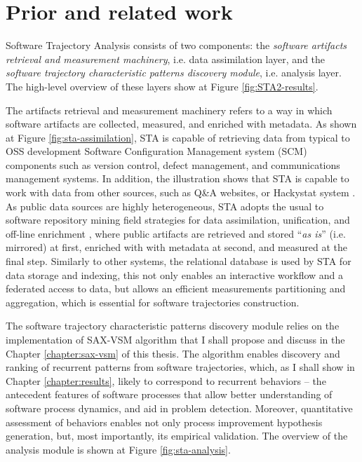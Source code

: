 \chapter{Prior and related work}\label{chapter_background_work}
Software Trajectory Analysis consists of two components: 
the \textit{software artifacts retrieval and measurement machinery}, i.e. data assimilation layer, 
and the \textit{software trajectory characteristic patterns discovery module}, i.e. analysis layer. 
The high-level overview of these layers show at Figure \ref{fig:STA2-results}.

The artifacts retrieval and measurement machinery refers to a way in which software artifacts are 
collected, measured, and enriched with metadata. 
As shown at Figure \ref{fig:sta-assimilation}, STA is capable of retrieving data from typical to 
OSS development Software Configuration Management system (SCM) components such as version control, 
defect management, and communications management systems. 
In addition, the illustration shows that STA is capable to work with data from other sources, 
such as Q\&A websites, or Hackystat system \cite{citeulike:557296}.
As public data sources are highly heterogeneous, STA adopts the usual to software repository mining 
field strategies for data assimilation, unification, and off-line enrichment \cite{german04_softchange}, 
where public artifacts are retrieved and stored ``\textit{as is}'' (i.e. mirrored) at first, 
enriched with with metadata at second, and measured at the final step.
Similarly to other systems, the relational database is used by STA for data storage and indexing, 
this not only enables an interactive workflow and a federated access to data, but allows an efficient 
measurements partitioning and aggregation, which is essential for software trajectories construction.

The software trajectory characteristic patterns discovery module relies on the implementation of 
SAX-VSM algorithm that I shall propose and discuss in the Chapter \ref{chapter:sax-vsm} of this thesis.
The algorithm enables discovery and ranking of recurrent patterns from software trajectories, 
which, as I shall show in Chapter \ref{chapter:results}, likely to correspond to recurrent behaviors -- 
the antecedent features of software processes that allow better understanding of software process dynamics, 
and aid in problem detection. Moreover, quantitative assessment of behaviors enables not only process 
improvement hypothesis generation, but, most importantly, its empirical validation.
The overview of the analysis module is shown at Figure \ref{fig:sta-analysis}.

